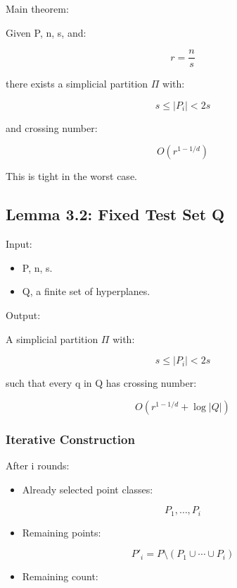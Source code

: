 \documentclass[
  11pt,
]{article}
\providecommand{\tightlist}{%
  \setlength{\itemsep}{0pt}\setlength{\parskip}{0pt}}
\begin{document}
Main theorem:

Given P, n, s, and:

\[
r=\frac{n}{s}
\]

there exists a simplicial partition \(\Pi\) with:

\[
s\le |P_i|<2s
\]

and crossing number:

\[
O(r^{1-1/d})
\]

This is tight in the worst case.

\hypertarget{lemma-3.2-fixed-test-set-q}{%
\subsection{Lemma 3.2: Fixed Test Set
Q}\label{lemma-3.2-fixed-test-set-q}}

Input:

\begin{itemize}
\tightlist
\item
  P, n, s.
\item
  Q, a finite set of hyperplanes.
\end{itemize}

Output:

A simplicial partition \(\Pi\) with:

\[
s\le |P_i|<2s
\]

such that every q in Q has crossing number:

\[
O(r^{1-1/d}+\log |Q|)
\]

\hypertarget{iterative-construction}{%
\subsubsection{Iterative Construction}\label{iterative-construction}}

After i rounds:

\begin{itemize}
\tightlist
\item
  Already selected point classes:
\end{itemize}

\[
P_1,\ldots,P_i
\]

\begin{itemize}
\tightlist
\item
  Remaining points:
\end{itemize}

\[
P'_i=P\setminus(P_1\cup\cdots\cup P_i)
\]

\begin{itemize}
\tightlist
\item
  Remaining count:
\end{itemize}
\end{document}
